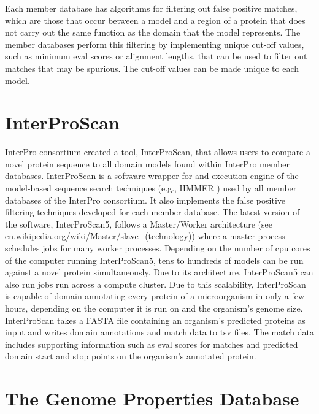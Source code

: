 Each member database has algorithms for filtering out false positive matches, which are those that occur between a model and a region of a protein that does not carry out the same function as the domain that the model represents. The member databases perform this filtering by implementing unique cut-off values, such as minimum \gls{eval} scores or alignment lengths, that can be used to filter out matches that may be spurious. The cut-off values can be made unique to each model. 

\section{InterProScan} \label{overview-interproscan}

InterPro consortium created a tool, InterProScan, that allows users to compare a novel protein sequence to all domain models found within InterPro member databases. InterProScan is a software wrapper for and execution engine of the model-based sequence search techniques (e.g., HMMER \cite{eddy2011accelerated}) used by all member databases of the InterPro consortium. It also implements the false positive filtering techniques developed for each member database. The latest version of the software, InterProScan5, follows a Master/Worker architecture (see \href{http://en.wikipedia.org/wiki/Master/slave_(technology)}{en.wikipedia.org/wiki/Master/slave\_(technology)}) where a master process schedules jobs for many worker processes. Depending on the number of \gls{cpu} cores of the computer running InterProScan5, tens to hundreds of models can be run against a novel protein simultaneously. Due to its architecture, InterProScan5 can also run jobs run across a compute cluster. Due to this scalability, InterProScan is capable of domain annotating every protein of a microorganism in only a few hours, depending on the computer it is run on and the organism's genome size. InterProScan takes a FASTA file \cite{pearson19905} containing an organism's predicted proteins as input and writes domain annotations and match data to \gls{tsv} files. The match data includes supporting information such as \gls{eval} scores for matches and predicted domain start and stop points on the organism's annotated protein.

\section{The Genome Properties Database} \label{genome-properties-overview}

